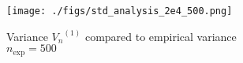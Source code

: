 	
	  \begin{figure}
		\centering
        \texttt{[image: ./figs/std\_analysis\_2e4\_500.png]}	
		\caption{Variance ${V_n}^{(1)}$ compared to empirical variance\\
				 $n_{\text{exp}} = 500$}
		\label{std_nein}
	  \end{figure} 
	
	
	
	
	
	
	
	
